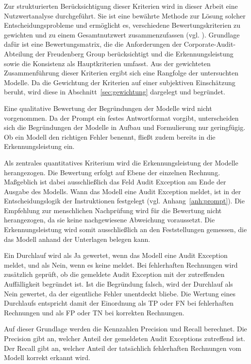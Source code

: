 Zur strukturierten Berücksichtigung dieser Kriterien wird in dieser Arbeit eine Nutzwertanalyse durchgeführt. Sie ist eine bewährte Methode zur Lösung solcher Entscheidungsprobleme und ermöglicht es, verschiedene Bewertungskriterien zu gewichten und zu einem Gesamtnutzwert zusammenzufassen (vgl. \cite[S.~79\,f.]{kuehnapfel2021}). Grundlage dafür ist eine Bewertungsmatrix, die die Anforderungen der Corporate-Audit-Abteilung der Freudenberg Group berücksichtigt und die Erkennungsleistung sowie die Konsistenz als Hauptkriterien umfasst. Aus der gewichteten Zusammenführung dieser Kriterien ergibt sich eine Rangfolge der untersuchten Modelle. Da die Gewichtung der Kriterien auf einer subjektiven Einschätzung beruht, wird diese in Abschnitt~\ref{sec:gewichtung} dargelegt und begründet.

Eine qualitative Bewertung der Begründungen der Modelle wird nicht vorgenommen. Da der Prompt ein festes Antwortformat vorgibt, unterscheiden sich die Begründungen der Modelle in Aufbau und Formulierung nur geringfügig. Ob ein Modell den richtigen Fehler benennt, fließt zudem bereits in die Erkennungsleistung ein.

Als zentrales quantitatives Kriterium wird die Erkennungsleistung der Modelle herangezogen. Die Bewertung erfolgt auf Ebene der einzelnen Rechnung. Maßgeblich ist dabei ausschließlich das Feld Audit Exception am Ende der Ausgabe des Modells. Wann das Modell eine Audit Exception meldet, ist in der Entscheidungslogik der Instruktionen festgelegt (vgl. Anhang~\ref{anh:prompt}). Die Empfehlung zur menschlichen Nachprüfung wird für die Bewertung nicht herangezogen, da sie keine nachgewiesene Abweichung voraussetzt. Die Erkennungsleistung wird somit ausschließlich an den Feststellungen gemessen, die das Modell anhand der Unterlagen belegen kann.

Ein Durchlauf wird als Ja gewertet, wenn das Modell eine Audit Exception meldet, und als Nein, wenn es keine meldet. Bei fehlerhaften Rechnungen wird zusätzlich geprüft, ob die gemeldete Audit Exception mit der zutreffenden Auffälligkeit begründet ist. Ist die Begründung falsch, wird der Durchlauf als Nein gewertet, da der eigentliche Fehler unentdeckt bliebe. Die Wertung eines Durchlaufs entspricht damit der Einordnung als \ac{TP} oder \ac{FN} bei fehlerhaften Rechnungen und als \ac{FP} oder \ac{TN} bei korrekten Rechnungen.

Auf dieser Grundlage werden die Kennzahlen Precision und Recall berechnet. Die Precision gibt an, welcher Anteil der gemeldeten Audit Exceptions zutreffend ist. Der Recall gibt an, welcher Anteil der tatsächlich fehlerhaften Rechnungen vom Modell korrekt erkannt wird.

